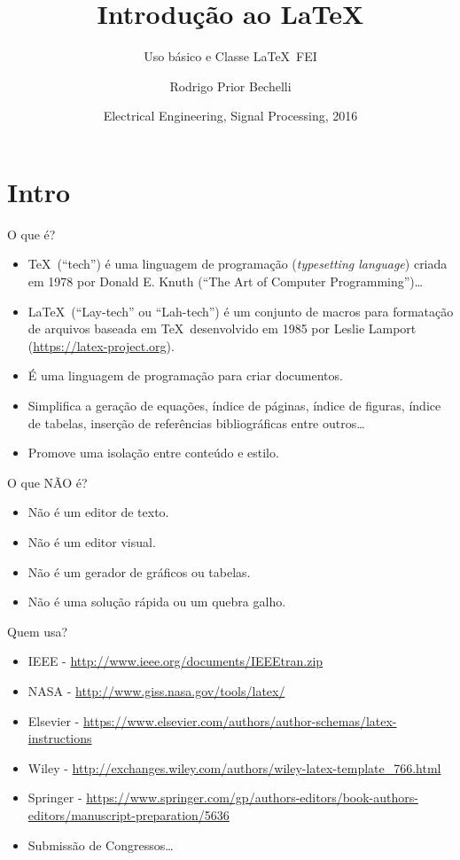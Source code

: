 \documentclass{beamer}
\title{Introdução ao \LaTeX}
\subtitle{Uso básico e Classe \LaTeX~FEI}
\author{Rodrigo Prior Bechelli}
\institute{Centro Universitário da FEI}
\date[SP 2016] %
{Electrical Engineering, Signal Processing, 2016}
\begin{document}
\begin{frame}
    \titlepage
\end{frame}


\section{Intro}


\begin{frame}{O que é?}
    \begin{itemize}
        \item \TeX~(``tech'') é uma linguagem de programação (\emph{typesetting language}) criada em 1978 por Donald E. Knuth (``The Art of Computer Programming'')\dots
        \item \LaTeX~(``Lay-tech'' ou ``Lah-tech'') é um conjunto de macros para formatação de arquivos baseada em \TeX~desenvolvido em 1985 por Leslie Lamport (\url{https://latex-project.org}).
        \item É uma linguagem de programação para criar documentos.
        \item Simplifica a geração de equações, índice de páginas, índice de figuras, índice de tabelas, inserção de referências bibliográficas entre outros\dots
        \item Promove uma isolação entre conteúdo e estilo.
    \end{itemize}
\end{frame}


\begin{frame}{O que NÃO é?}
    \begin{itemize}
        \item Não é um editor de texto.
        \item Não é um editor visual.
        \item Não é um gerador de gráficos ou tabelas.
        \item Não é uma solução rápida ou um quebra galho.
    \end{itemize}
\end{frame}


\begin{frame}{Quem usa?}
    \begin{itemize}
        \item IEEE - \url{http://www.ieee.org/documents/IEEEtran.zip}
        \item NASA - \url{http://www.giss.nasa.gov/tools/latex/}
        \item Elsevier - \url{https://www.elsevier.com/authors/author-schemas/latex-instructions}
        \item Wiley - \url{http://exchanges.wiley.com/authors/wiley-latex-template_766.html}
        \item Springer - \url{https://www.springer.com/gp/authors-editors/book-authors-editors/manuscript-preparation/5636}
        \item Submissão de Congressos\dots
    \end{itemize}
\end{frame}
\end{document}
